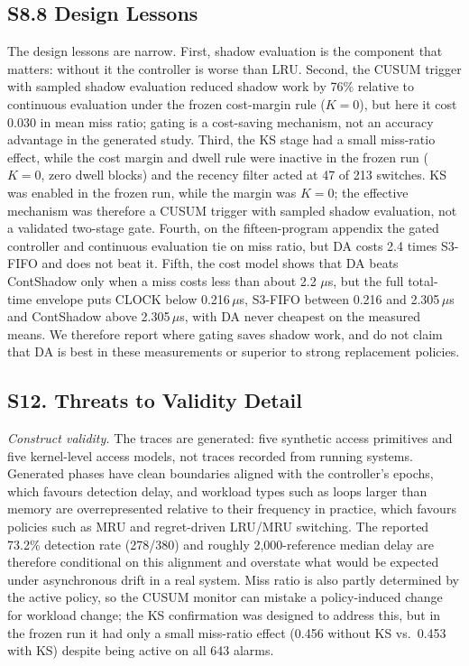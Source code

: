 \documentclass[journal,onecolumn]{IEEEtran}
\begin{document}
\subsection*{S8.8 Design Lessons}
The design lessons are narrow. First, shadow
evaluation is the component that matters: without it the controller is worse
than LRU. Second, the CUSUM trigger with sampled shadow evaluation reduced
shadow work by 76\% relative to continuous evaluation under the frozen cost-margin
rule ($K = 0$), but here it cost 0.030 in mean miss ratio; gating is a
cost-saving mechanism, not an accuracy advantage in the generated study. Third,
the KS stage had a small miss-ratio effect, while the cost margin and dwell
rule were inactive in the frozen run ($K = 0$, zero dwell blocks) and the
recency filter acted at 47 of 213 switches. KS was enabled in the frozen run,
while the margin was $K = 0$; the
effective mechanism was therefore a CUSUM trigger with sampled shadow
evaluation, not a validated two-stage gate. Fourth, on the fifteen-program
appendix the gated controller and continuous evaluation tie on miss ratio, but
DA costs 2.4 times S3-FIFO and does not beat it. Fifth, the cost model shows
that DA beats ContShadow only when a miss costs less than about 2.2 $\mu$s,
but the full total-time envelope puts CLOCK below 0.216\,$\mu$s, S3-FIFO
between 0.216 and 2.305\,$\mu$s and ContShadow above 2.305\,$\mu$s, with DA
never cheapest on the measured means. We therefore report where gating saves
shadow work, and do not claim that DA is best in these measurements or superior
to strong replacement policies.


\subsection*{S12. Threats to Validity Detail}
\emph{Construct validity.} The traces are generated: five synthetic access
primitives and five kernel-level access models, not traces recorded from
running systems. Generated phases have clean boundaries aligned with the controller's epochs,
which favours detection delay, and workload types such as loops larger than
memory are overrepresented relative to their frequency in practice, which
favours policies such as MRU and regret-driven LRU/MRU switching. The reported
73.2\% detection rate (278/380) and roughly 2,000-reference
median delay are therefore conditional on this alignment and overstate what
would be expected under asynchronous drift in a real system. Miss ratio is also partly determined by the active policy, so the
CUSUM monitor can mistake a policy-induced change for workload change; the KS confirmation was designed
to address this, but in the frozen run it had only a small miss-ratio effect
(0.456 without KS vs.\ 0.453 with KS) despite being active on all 643 alarms.
\end{document}
